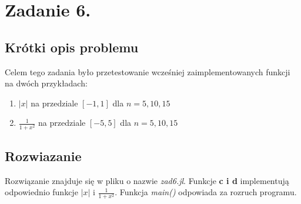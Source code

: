\documentclass[a4paper,14pt]{report}
\begin{document}
\chapter{Zadanie 6.}
  \section{Krótki opis problemu}
    Celem tego zadania było przetestowanie wcześniej zaimplementowanych funkcji na dwóch przykładach:
    \begin{enumerate}
      \item $|x|$ na przedziale $[-1,1]$ dla $n=5,10,15$
      \item $\frac{1}{1+x^{2}}$ na przedziale $[-5,5]$ dla $n=5,10,15$
    \end{enumerate}
  \section{Rozwiazanie}
    Rozwiązanie znajduje się w pliku o nazwie \textit{zad6.jl}. Funkcje \textbf{c i d} implementują odpowiednio funkcje $|x|$ i $\frac{1}{1+x^{2}}$. Funkcja \textit{main()} odpowiada za rozruch programu.
\end{document}

